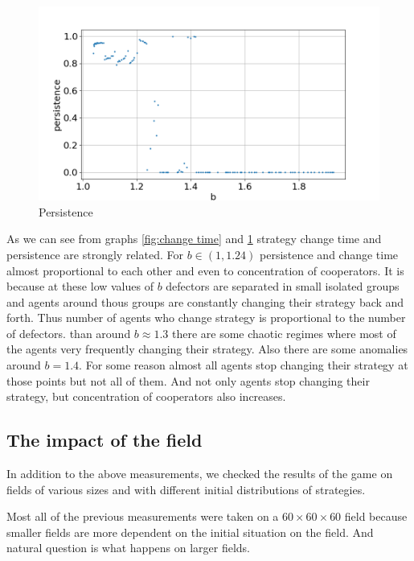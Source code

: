 \documentclass[a4paper,12pt]{article}
\begin{document}
\begin{figure}[h]
	\includegraphics[width = \textwidth]{Persistence.png}
	\caption{Persistence}
	\label{fig:persistence}
\end{figure}

As we can see from graphs \ref{fig:change time} and \ref{fig:persistence} strategy change time and persistence are strongly related. For $b\in(1, 1.24)$ persistence and change time almost proportional to each other and even to concentration of cooperators. It is because at these low values of $b$ defectors are separated in small isolated groups and agents around thous groups are constantly changing their strategy back and forth. Thus number of agents who change strategy is proportional to the number of defectors. than around $b \approx 1.3$ there are some chaotic regimes where most of the agents very frequently changing their strategy. Also there are some anomalies around $b = 1.4$. For some reason almost all agents stop changing their strategy at those points but not all of them. And not only agents stop changing their strategy, but concentration of cooperators also increases. 

\subsection{The impact of the field}
In addition to the above measurements, we checked the results of the game on fields of various sizes and with different initial distributions of strategies.

Most all of the previous measurements were taken on a $60\times60\times60$ field because smaller fields are more dependent on the initial situation on the field. And natural question is what happens on larger fields.
\end{document}

